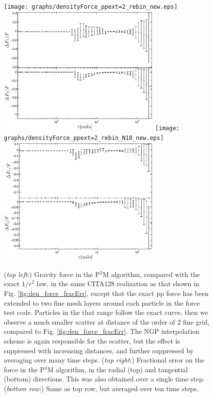  \begin{figure}%
  \begin{center}
    \texttt{[image: graphs/densityForce\_ppext=2\_rebin\_new.eps]}
    \includegraphics[width=3.2in]{graphs/densityForce_fracErr_ppext=2_rebin_new.eps}
     \texttt{[image: graphs/densityForce\_ppext=2\_rebin\_N10\_new.eps]}
    \includegraphics[width=3.2in]{graphs/densityForce_fracErr_ppext=2_rebin_N10_new.eps}
    \caption{({\it top left}:) Gravity force in the P$^3$M algorithm, compared with the exact $1/r^{2}$ law,
  in the same CITA128 realization as that shown in Fig. \ref{fig:den_force_fracErr}, 
  except that the exact pp force has been extended to two fine mesh layers around each particle
  in the force test code.
  Particles in the that range follow the exact curve, then we observe a much smaller scatter at 
  distance of the order of 2 fine grid, compared to Fig. \ref{fig:den_force_fracErr}. 
  The NGP interpolation scheme is again responsible for the scatter, but the effect is suppressed with increasing distances, and further suppressed by averaging over many time steps.
  ({\it top right}:) Fractional error on the force in the P$^3$M algorithm, in the radial (top) and tangential (bottom) directions.
  This was also obtained over a single time step.
  ({\it bottom row}:) Same as top row, but averaged over ten time steps.
    \label{fig:den_force_fracErr_ppext6}}
\end{center}
\end{figure}

